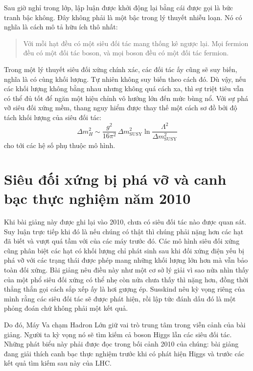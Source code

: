 Sau giờ nghỉ trong lớp, lập luận được khởi động lại bằng cái được gọi là bức tranh bậc không. Đây không phải là một bậc trong lý thuyết nhiễu loạn. Nó có nghĩa là cách mô tả hữu ích thô nhất:
\begin{quote}
Với mỗi hạt đều có một siêu đối tác mang thống kê ngược lại. Mọi fermion đều có một đối tác boson, và mọi boson đều có một đối tác fermion.
\end{quote}
Trong một lý thuyết siêu đối xứng chính xác, các đối tác ấy cũng sẽ suy biến, nghĩa là có cùng khối lượng. Tự nhiên không suy biến theo cách đó. Dù vậy, nếu các khối lượng không bằng nhau nhưng không quá cách xa, thì sự triệt tiêu vẫn có thể đủ tốt để ngăn một hiệu chỉnh vô hướng lớn đến mức bùng nổ. Với sự phá vỡ siêu đối xứng mềm, thang nguy hiểm được thay thế một cách sơ đồ bởi độ tách khối lượng của siêu đối tác:
\begin{equation}
\Delta m_H^2\sim
\frac{g^2}{16\pi^2}\,\Delta m_{\mathrm{SUSY}}^2
\ln\!\frac{\Lambda^2}{\Delta m_{\mathrm{SUSY}}^2}
\end{equation}
cho tới các hệ số phụ thuộc mô hình.

\section{Siêu đối xứng bị phá vỡ và canh bạc thực nghiệm năm 2010}

Khi bài giảng này được ghi lại vào 2010, chưa có siêu đối tác nào được quan sát. Suy luận trực tiếp khi đó là nếu chúng có thật thì chúng phải nặng hơn các hạt đã biết và vượt quá tầm với của các máy trước đó. Các mô hình siêu đối xứng cũng phân biệt các hạt có khối lượng chỉ phát sinh sau khi đối xứng điện yếu bị phá vỡ với các trạng thái được phép mang những khối lượng lớn hơn mà vẫn bảo toàn đối xứng. Bài giảng nêu điều này như một cơ sở lý giải vì sao nửa nhìn thấy của một phổ siêu đối xứng có thể nhẹ còn nửa chưa thấy thì nặng hơn, đồng thời thẳng thắn gọi cách sắp xếp ấy là hơi gượng ép. Susskind nêu kỳ vọng riêng của mình rằng các siêu đối tác sẽ được phát hiện, rồi lập tức đánh dấu đó là một phỏng đoán chứ không phải một kết quả.

Do đó, Máy Va chạm Hadron Lớn giữ vai trò trung tâm trong viễn cảnh của bài giảng. Người ta kỳ vọng nó sẽ tìm kiếm cả boson Higgs lẫn các siêu đối tác. Những phát biểu này phải được đọc trong bối cảnh 2010 của chúng: bài giảng đang giải thích canh bạc thực nghiệm trước khi có phát hiện Higgs và trước các kết quả tìm kiếm sau này của LHC.

